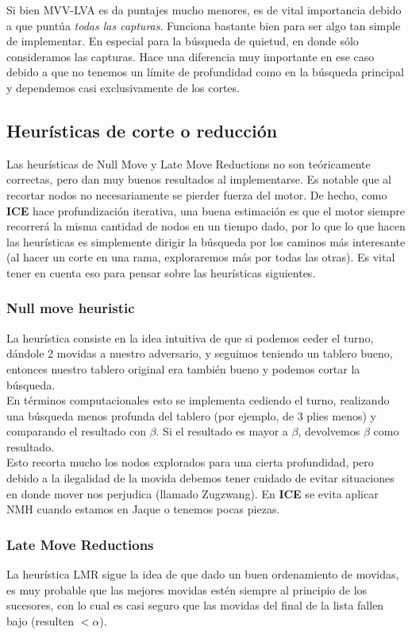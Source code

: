 \documentclass{article}
\newcommand{\ICE}[0]{{\bf ICE}}
\begin{document}
\begin{multicols}{2}
Si bien MVV-LVA es da puntajes mucho menores, es de vital importancia
debido a que puntúa \emph{todas las capturas}. Funciona bastante
bien para ser algo tan simple de implementar. En especial para la
búsqueda de quietud, en donde sólo consideramos las capturas. Hace
una diferencia muy importante en ese caso debido a que no tenemos un
límite de profundidad como en la búsqueda principal y dependemos casi
exclusivamente de los cortes.

\subsection{Heurísticas de corte o reducción}

Las heurísticas de Null Move y Late Move Reductions no son
teóricamente correctas, pero dan muy buenos resultados al
implementarse. Es notable que al recortar nodos no necesariamente se
pierder fuerza del motor. De hecho, como \ICE{} hace profundización
iterativa, una buena estimación es que el motor siempre recorrerá
la misma cantidad de nodos en un tiempo dado, por lo que lo que hacen
las heurísticas es simplemente dirigir la búsqueda por los caminos
más interesante (al hacer un corte en una rama, exploraremos más por
todas las otras). Es vital tener en cuenta eso para pensar sobre las
heurísticas siguientes.

\subsubsection{Null move heuristic}
La heurística consiste en la idea intuitiva de que si podemos ceder el
turno, dándole 2 movidas a nuestro adversario, y seguimos teniendo un
tablero bueno, entonces nuestro tablero original era también bueno y
podemos cortar la búsqueda.
\\

En términos computacionales esto se implementa cediendo el turno,
realizando una búsqueda menos profunda del tablero (por ejemplo, de 3
plies menos) y comparando el resultado con $\beta$. Si el resultado es
mayor a $\beta$, devolvemos $\beta$ como resultado.
\\

Esto recorta mucho los nodos explorados para una cierta profundidad,
pero debido a la ilegalidad de la movida debemos tener cuidado de evitar
situaciones en donde mover nos perjudica (llamado Zugzwang). En \ICE{}
se evita aplicar NMH cuando estamos en Jaque o tenemos pocas piezas.

\subsubsection{Late Move Reductions}
La heurística LMR sigue la idea de que dado un buen ordenamiento de
movidas, es muy probable que las mejores movidas estén siempre al
principio de los sucesores, con lo cual es casi seguro que las movidas
del final de la lista fallen bajo (resulten $< \alpha$).
\\


\end{multicols}
\end{document}

